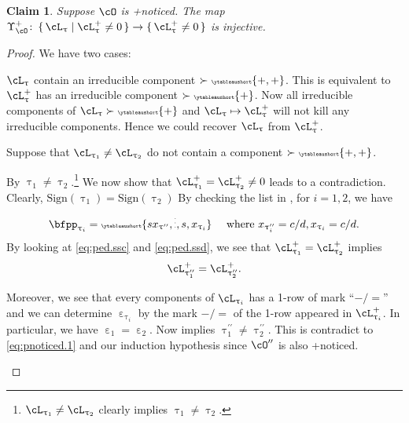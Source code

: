\documentclass[12pt,a4paper]{amsart}
\numberwithin{equation}{section}
\newtheorem{claim}[thm]{Claim}
\theoremstyle{remark}
\def\ssign{\mathrm{Sign}}
\let\ytb=\ytableaushort
\newcommand{\tytb}[1]{{\tiny\ytb{#1}}}
\def\cOpp{\cO^{\prime\prime}}
\def\pUpsilon{\Upsilon^+}
\def\pcL{\cL^+}
\def\uptaupp{\uptau^{\prime\prime}}
\begin{document}
\begin{claim}\label{c:gd.pnoticed}\label{c:gd.pnoticed.p}
    Suppose $\cO$ is +noticed.
    The map
    $\pUpsilon_{\cO} \colon \set{\cL_{\uptau}|\pcL_{\uptau}\neq 0}\rightarrow \set{\pcL_{\uptau}\neq 0}$
    is injective.
\end{claim}
\begin{proof}
    We have two cases:
    \begin{enumPF}
      \item $\cL_{\uptau}$ contain an irreducible component $\succ \tytb{+,+}$.
      This is equivalent to $\pcL_{\uptau}$ has an irreducible component
      $\succ\tytb{+}$. Now all irreducible components of
      $\cL_{\uptau} \succ \tytb{+}$ and $\cL_{\uptau}\mapsto \pcL_{\uptau}$ will
      not kill any irreducible components. Hence we could recover $\cL_{\uptau}$
      from $\pcL_{\uptau}$.%
      \item Suppose that $\cL_{\uptau_{1}}\neq \cL_{\uptau_{2}}$ do not contain
      a component $\succ \tytb{+,+}$.

      By 
      $\uptau_{1}\neq \uptau_{2}$.\footnote{$\cL_{\uptau_{1}}\neq \cL_{\uptau_{2}}$
        clearly implies $\uptau_{1}\neq \uptau_{2}$.} We now show that
      $\pcL_{\uptau_{1}}=\pcL_{\uptau_{2}}\neq 0$ leads to a contradiction.
      Clearly, $\ssign(\uptau_{1})=\ssign(\uptau_{2})$ By checking the list in
      , for $i=1,2$, we have
      \[
        \bfpp_{\uptau_{i}} = \tytb{s{x_{\uptaupp}},\vdots,s,{x_{\uptau_{i}}}} \quad \text{
          where }x_{\uptaupp_{i}}=c/d, x_{\uptau_{i}}=c/d.
      \]
      By looking at \eqref{eq:ped.ssc} and \eqref{eq:ped.ssd}, we see that
      $\pcL_{\uptau_{1}}=\pcL_{\uptau_{2}}$ implies
      \begin{equation}\label{eq:pnoticed.1}
        \pcL_{\uptaupp_{1}}=\pcL_{\uptaupp_{2}}.
      \end{equation}

      Moreover, we see that every components of $\cL_{\uptau_{i}}$ has a 1-row
      of mark ``$-/=$'' and we can determine $\upepsilon_{\uptau_{i}}$ by the
      mark $-/=$ of the 1-row appeared in $\pcL_{\uptau_{i}}$. In particular, we
      have $\upepsilon_{1}=\upepsilon_{2}$. Now  implies
      $\uptaupp_{1}\neq \uptaupp_{2}$. This is contradict to
      \eqref{eq:pnoticed.1} and our induction hypothesis since $\cOpp$ is also
      +noticed.


\end{enumPF}
\end{proof}
\end{document}
